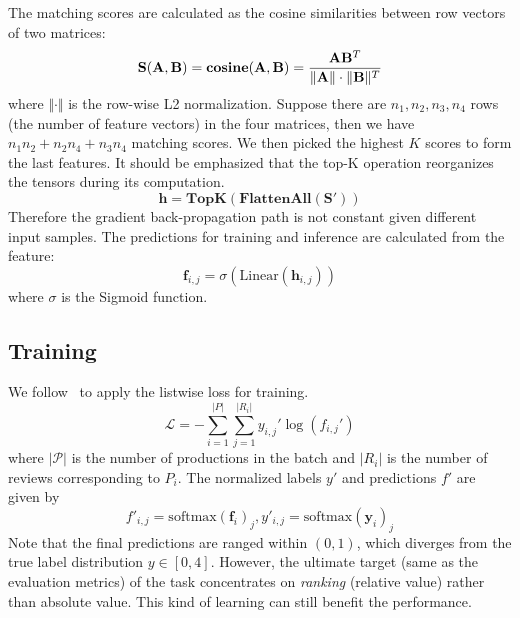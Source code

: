 The matching scores are calculated as the cosine similarities between row vectors of two matrices:
\begin{equation}
    \label{eq:cos_sim}
    \textbf{S}(\mathbf{A},\mathbf{B}) = \mathbf{cosine}(\mathbf{A},\mathbf{B}) = \frac{\mathbf{A}\mathbf{B}^T}{\Vert \mathbf{A} \Vert\cdot\Vert \mathbf{B} \Vert^T} \\
\end{equation}
where $\Vert \cdot \Vert$ is the row-wise L2 normalization.
Suppose there are $n_1,n_2,n_3,n_4$ rows (the number of feature vectors) in the four matrices, then we have $n_1n_2+n_2n_4+n_3n_4$ matching scores.
We then picked the highest $K$ scores to form the last features. 
It should be emphasized that the top-K operation reorganizes the tensors during its computation. 
\begin{equation}
    \mathbf{h} = \mathbf{TopK}(\mathbf{FlattenAll}(\mathbf{S'}))
\end{equation}
Therefore the gradient back-propagation path is not constant given different input samples. The predictions for training and inference are calculated from the feature:
\begin{equation}
    \mathbf{f}_{i,j} = \sigma(\mathrm{Linear}(\mathbf{h}_{i,j}))
\end{equation}
where $\sigma$ is the Sigmoid function.

\subsection{Training}
\label{sec:Training}
We follow \citet{nguyen2023gradient}~to apply the listwise loss for training.
\begin{equation}
    \mathcal{L} = -\sum_{i=1}^{\vert P \vert}\sum_{j=1}^{\vert R_i \vert}y_{i,j}'\log(f_{i,j}')
\end{equation}
where $\vert \mathcal{P} \vert$ is the number of productions in the batch and $\vert R_i \vert$ is the number of reviews corresponding to $P_i$. The normalized labels $y'$ and predictions $f'$ are given by
\begin{equation}
    f'_{i,j} = \mathrm{softmax}(\mathbf{f}_i)_j,
    y'_{i,j} = \mathrm{softmax}(\mathbf{y}_i)_j
\end{equation}
Note that the final predictions are ranged within $(0, 1)$, which diverges from the true label distribution $y \in [0,4]$. However, the ultimate target (same as the evaluation metrics) of the task concentrates on \textit{ranking} (relative value) rather than absolute value. This kind of learning can still benefit the performance.
